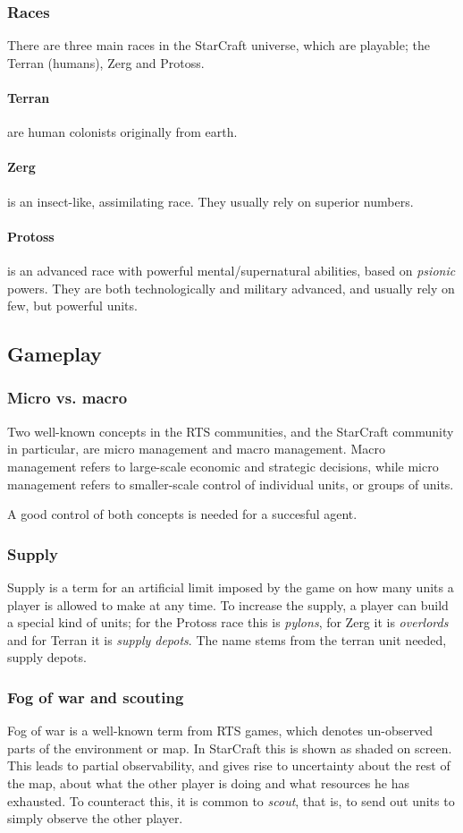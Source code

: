 \subsubsection{Races}
There are three main races in the StarCraft universe, which are playable; the Terran (humans), Zerg and Protoss.
\paragraph{Terran} are human colonists originally from earth.
\paragraph{Zerg} is an insect-like, assimilating race. They usually rely on superior numbers.
\paragraph{Protoss} is an advanced race with powerful mental/supernatural abilities, based on {\em psionic} powers. They are both technologically and military advanced, and usually rely on few, but powerful units.

\subsection{Gameplay}
\subsubsection{Micro vs. macro}
Two well-known concepts in the RTS communities, and the StarCraft community in particular, are micro management and macro management. Macro management refers to large-scale economic and strategic decisions, while micro management refers to smaller-scale control of individual units, or groups of units.

A good control of both concepts is needed for a succesful agent.

\subsubsection{Supply}
Supply is a term for an artificial limit imposed by the game on how many units a player is allowed to make at any time. To increase the supply, a player can build a special kind of units; for the Protoss race this is {\em pylons}, for Zerg it is {\em overlords} and for Terran it is {\em supply depots}. The name stems from the terran unit needed, supply depots.

\subsubsection{Fog of war and scouting}
Fog of war is a well-known term from RTS games, which denotes un-observed parts of the environment or map. In StarCraft this is shown as shaded on screen. This leads to partial observability, and gives rise to uncertainty about the rest of the map, about what the other player is doing and what resources he has exhausted. To counteract this, it is common to {\em scout}, that is, to send out units to simply observe the other player.

